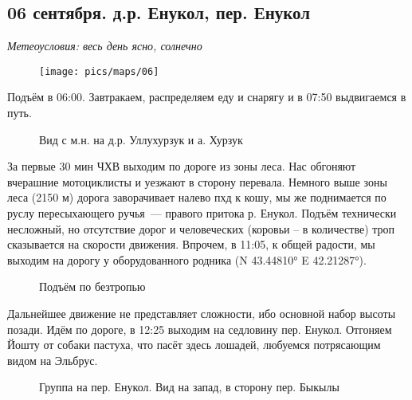 \subsection{06 сентября. д.р. Енукол, пер. Енукол}
\textit{Метеоусловия: весь день ясно, солнечно}

\begin{figure}[h!]
	\centering
	\texttt{[image: pics/maps/06]}
	\label{fig:06}
\end{figure}

Подъём в 06:00. Завтракаем, распределяем еду и снарягу и в 07:50 выдвигаемся в путь.

\begin{figure}[h!]
	\centering
	\caption{Вид с м.н. на д.р. Уллухурзук и а. Хурзук}
	\label{fig:camp05}
\end{figure}

За первые 30 мин ЧХВ выходим по дороге из зоны леса. Нас обгоняют вчерашние мотоциклисты и уезжают в сторону перевала. Немного выше зоны леса (2150 м) дорога заворачивает налево пхд к кошу, мы же поднимается по руслу пересыхающего ручья~--- правого притока р. Енукол. Подъём технически несложный, но отсутствие дорог и человеческих (коровьи -- в количестве) троп сказывается на скорости движения. Впрочем, в 11:05, к общей радости, мы выходим на дорогу у оборудованного родника (N 43.44810° E 42.21287°).


\begin{figure}[h!]
	\centering
	\caption{Подъём по безтропью}
	\label{fig:_enikol_uphill}
\end{figure}



Дальнейшее движение не представляет сложности, ибо основной набор высоты позади. Идём по дороге, в 12:25 выходим на седловину пер. Енукол. Отгоняем Йошту от собаки пастуха, что пасёт здесь лошадей, любуемся потрясающим видом на Эльбрус.

\begin{figure}[h!]
	\centering
	\caption{Группа на пер. Енукол. Вид на запад, в сторону пер. Быкылы}
	\label{fig:enukol}
\end{figure}

